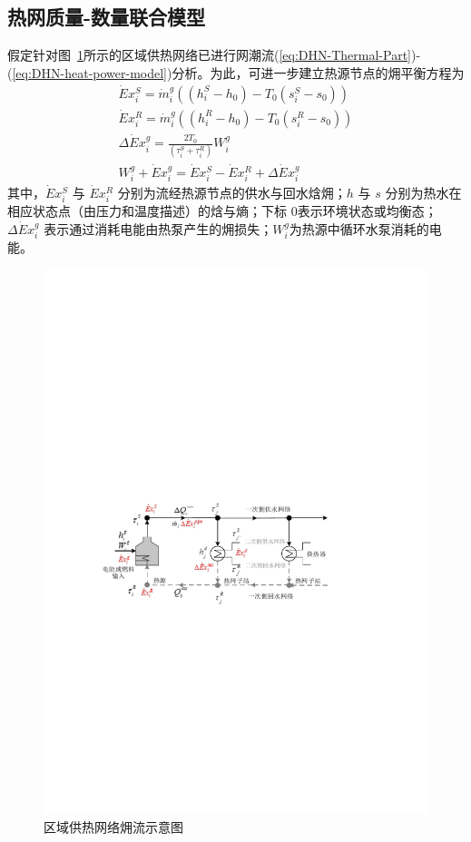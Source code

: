 \subsection{热网质量-数量联合模型}
\label{sec:DHN-Exergy-Model}
假定针对图~\ref{Fig:DHN-Topology-Exergy}所示的区域供热网络已进行网潮流(\ref{eq:DHN-Thermal-Part})-(\ref{eq:DHN-heat-power-model})分析。为此，可进一步建立热源节点的㶲平衡方程为
\begin{subequations}
\label{eq:exergy-heat-source}
\begin{gather}
\dot Ex_i^S = {{\dot m}_i^g}{(({h_i^S - {h_0}}) - {T_0}({s_i^S - {s_0}}))}\\
\dot Ex_i^R = {{\dot m}_i^g}{(({h_i^R - {h_0}}) - {T_0}({s_i^R - {s_0}}))} \\
\Delta \dot Ex_i^g = \frac{{2{T_0}}}{{\left( {\tau_i^S + \tau_i^R} \right)}}W_i^g\\
W_i^g + \dot Ex_i^g = \dot Ex_i^S - \dot Ex_i^R + \Delta \dot Ex_i^g
\end{gather}
\end{subequations}
其中，$\dot Ex_i^S$ 与 $\dot Ex_i^R$ 分别为流经热源节点的供水与回水焓㶲；$h$ 与 $s$ 分别为热水在相应状态点（由压力和温度描述）的焓与熵；下标 0表示环境状态或均衡态；$\Delta \dot Ex_i^g$ 表示通过消耗电能由热泵产生的㶲损失；$W_i^g$为热源中循环水泵消耗的电能。

\begin{figure}[H]
\centering
\includegraphics[scale=0.79]{figures/chap4-4-DHN-Exergy-Model-V2.pdf}
\caption{区域供热网络㶲流示意图}
\label{Fig:DHN-Topology-Exergy}
\end{figure}

